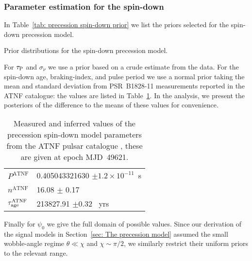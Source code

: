 \documentclass[../full_thesis/full_thesis.tex]{subfiles}
\newcommand{\thisdir}{../comparing_periodic_modulations}
\begin{document}
\subsubsection{Parameter estimation for the spin-down}

In Table~\ref{tab: precession spin-down prior} we list the priors selected for
the spin-down precession model.
\begin{table}[htb]
\small
\centering
\caption{Prior distributions for the spin-down precession model.}
\label{tab: precession spin-down prior}

\end{table}
For $\tau_{\mathrm{P}}$ and
$\sigma_{\dot{\nu}}$ we use a prior based on a crude estimate from the data.
For the spin-down age, braking-index, and pulse period we use a normal prior
taking the mean and standard deviation from PSR~B1828-11 measurements reported in the
ATNF catalogue: the values are listed in Table~\ref{tab: ATNF}. In the analysis,
we present the posteriors of the difference to the means of these values for
convenience.
\begin{table}[htb]
\small
\centering
\caption{Measured and inferred values of the precession spin-down model parameters
from the ATNF pulsar catalogue \citep{ATNF}, these are given at epoch MJD~49621.}
\label{tab: ATNF}
\begin{tabular}{ll} \hline \rule{0pt}{3ex}
$P^{\mathrm{ATNF}}$ & 0.405043321630 $\pm 1.2\times10^{-11}$~s \\
$n^{\mathrm{ATNF}}$ & 16.08 $\pm$ 0.17 \\
$\tau_{\mathrm{age}}^{\mathrm{ATNF}}$ & 213827.91 $\pm 0.32$~ yrs\\
\end{tabular}
\end{table}
Finally for $\psi_0$ we give the full domain of
possible values. Since our derivation of the signal models in Section~\ref{sec:
The precession model} assumed the small wobble-angle regime $\theta \ll \chi$
and $\chi \sim \pi/2$, we similarly restrict their uniform priors to the
relevant range.
\end{document}

